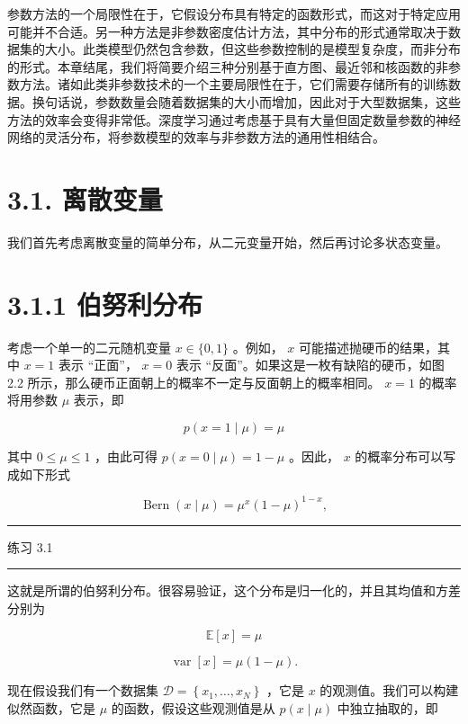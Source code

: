 \documentclass[10pt]{report}
\newcommand{\HRule}{\begin{center}\rule{0.9\linewidth}{0.2mm}\end{center}}
\begin{document}
参数方法的一个局限性在于，它假设分布具有特定的函数形式，而这对于特定应用可能并不合适。另一种方法是非参数密度估计方法，其中分布的形式通常取决于数据集的大小。此类模型仍然包含参数，但这些参数控制的是模型复杂度，而非分布的形式。本章结尾，我们将简要介绍三种分别基于直方图、最近邻和核函数的非参数方法。诸如此类非参数技术的一个主要局限性在于，它们需要存储所有的训练数据。换句话说，参数数量会随着数据集的大小而增加，因此对于大型数据集，这些方法的效率会变得非常低。深度学习通过考虑基于具有大量但固定数量参数的神经网络的灵活分布，将参数模型的效率与非参数方法的通用性相结合。

\section*{3.1. 离散变量}

我们首先考虑离散变量的简单分布，从二元变量开始，然后再讨论多状态变量。

\section*{3.1.1 伯努利分布}

考虑一个单一的二元随机变量 \(x \in  \{ 0,1\}\) 。例如， \(x\) 可能描述抛硬币的结果，其中 \(x = 1\) 表示 “正面”， \(x = 0\) 表示 “反面”。如果这是一枚有缺陷的硬币，如图 2.2 所示，那么硬币正面朝上的概率不一定与反面朝上的概率相同。 \(x = 1\) 的概率将用参数 \(\mu\) 表示，即

\[
p\left( {x = 1 \mid  \mu }\right)  = \mu  \tag{3.1}
\]

其中 \(0 \leq  \mu  \leq  1\) ，由此可得 \(p\left( {x = 0 \mid  \mu }\right)  = 1 - \mu\) 。因此， \(x\) 的概率分布可以写成如下形式

\[
\operatorname{Bern}\left( {x \mid  \mu }\right)  = {\mu }^{x}{\left( 1 - \mu \right) }^{1 - x}, \tag{3.2}
\]

\HRule

练习 3.1

\HRule

这就是所谓的伯努利分布。很容易验证，这个分布是归一化的，并且其均值和方差分别为

\[
\mathbb{E}\left\lbrack  x\right\rbrack   = \mu  \tag{3.3}
\]

\[
\operatorname{var}\left\lbrack  x\right\rbrack   = \mu \left( {1 - \mu }\right) . \tag{3.4}
\]

现在假设我们有一个数据集 \(\mathcal{D} = \left\{  {{x}_{1},\ldots ,{x}_{N}}\right\}\) ，它是 \(x\) 的观测值。我们可以构建似然函数，它是 \(\mu\) 的函数，假设这些观测值是从 \(p\left( {x \mid  \mu }\right)\) 中独立抽取的，即
\end{document}

